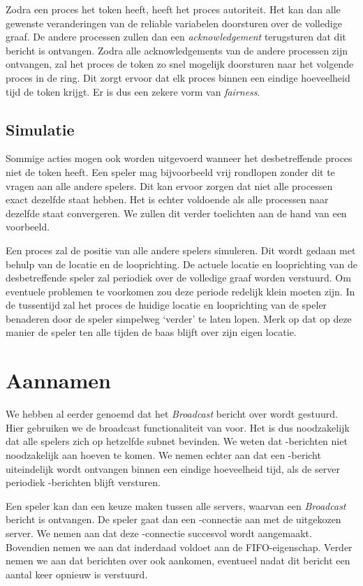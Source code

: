     Zodra een proces het token heeft, heeft het proces autoriteit. Het kan dan alle gewenste veranderingen van de reliable variabelen doorsturen over de volledige graaf. De andere processen zullen dan een \emph{acknowledgement} terugsturen dat dit bericht is ontvangen. Zodra alle acknowledgements van de andere processen zijn ontvangen, zal het proces de token zo snel mogelijk doorsturen naar het volgende proces in de ring. Dit zorgt ervoor dat elk proces binnen een eindige hoeveelheid tijd de token krijgt. Er is dus een zekere vorm van \emph{fairness}.

    \subsection{Simulatie}
    Sommige acties mogen ook worden uitgevoerd wanneer het desbetreffende proces niet de token heeft. Een speler mag bijvoorbeeld vrij rondlopen zonder dit te vragen aan alle andere spelers. Dit kan ervoor zorgen dat niet alle processen exact dezelfde staat hebben. Het is echter voldoende als alle processen naar dezelfde staat convergeren. We zullen dit verder toelichten aan de hand van een voorbeeld.

    Een proces zal de positie van alle andere spelers simuleren. Dit wordt gedaan met behulp van de locatie en de looprichting. De actuele locatie en looprichting van de desbetreffende speler zal periodiek over de volledige graaf worden verstuurd. Om eventuele problemen te voorkomen zou deze periode redelijk klein moeten zijn. In de tussentijd zal het proces de huidige locatie en looprichting van de speler benaderen door de speler simpelweg `verder' te laten lopen. Merk op dat op deze manier de speler ten alle tijden de baas blijft over zijn eigen locatie.

    \section{Aannamen}
    We hebben al eerder genoemd dat het \emph{Broadcast} bericht over \udp wordt gestuurd. Hier gebruiken we de broadcast functionaliteit van \udp voor. Het is dus noodzakelijk dat alle spelers zich op hetzelfde subnet bevinden. We weten dat \udp-berichten niet noodzakelijk aan hoeven te komen. We nemen echter aan dat een \udp-bericht uiteindelijk wordt ontvangen binnen een eindige hoeveelheid tijd, als de server periodiek \udp-berichten blijft versturen.

    Een speler kan dan een keuze maken tussen alle servers, waarvan een \emph{Broadcast} bericht is ontvangen. De speler gaat dan een \tcp-connectie aan met de uitgekozen server. We nemen aan dat deze \tcp-connectie succesvol wordt aangemaakt. Bovendien nemen we aan dat \tcp inderdaad voldoet aan de FIFO-eigenschap. Verder nemen we aan dat berichten over \tcp ook aankomen, eventueel nadat dit bericht een aantal keer opnieuw is verstuurd.

